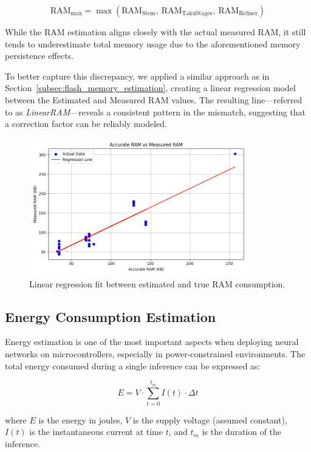 \begin{equation}
\text{RAM}_{\text{max}} = \max\left( \text{RAM}_{\text{Stem}},\ \text{RAM}_{\text{TakuStages}},\ \text{RAM}_{\text{Refiner}} \right)
\label{eq:max_ram}
\end{equation}

While the RAM estimation aligns closely with the actual measured RAM, it still tends to underestimate total memory usage due to the aforementioned memory persistence effects.

To better capture this discrepancy, we applied a similar approach as in  Section~\ref{subsec:flash_memory_estimation}, creating a linear regression model between the Estimated and Measured RAM values. The resulting line—referred to as \textit{LinearRAM}—reveals a consistent pattern in the mismatch, suggesting that a correction factor can be reliably modeled.

\begin{figure}[ht]
  \centering
  \includegraphics[width=0.85\textwidth]{Pictures/ram_accurate_vs_measured.png}
  \caption{Linear regression fit between estimated and true RAM consumption.}
  \label{fig:ram-linear-regression}
\end{figure}

\subsection{Energy Consumption Estimation}

Energy estimation is one of the most important aspects when deploying neural networks on microcontrollers, especially in power-constrained environments. The total energy consumed during a single inference can be expressed as:

\[
E = V \cdot \sum_{t=0}^{t_m} I(t) \cdot \Delta t
\]

where \( E \) is the energy in joules, \( V \) is the supply voltage (assumed constant), \( I(t) \) is the instantaneous current at time \( t \), and \( t_m \) is the duration of the inference.

